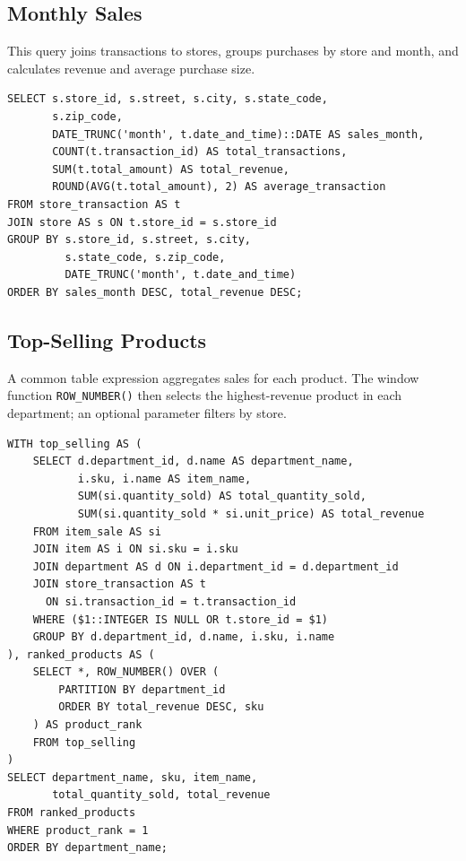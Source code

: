 \documentclass[11pt,letterpaper]{article}
\begin{document}
\subsection{Monthly Sales}

This query joins transactions to stores, groups purchases by store and month, and calculates revenue and average purchase size.

\begin{lstlisting}
SELECT s.store_id, s.street, s.city, s.state_code,
       s.zip_code,
       DATE_TRUNC('month', t.date_and_time)::DATE AS sales_month,
       COUNT(t.transaction_id) AS total_transactions,
       SUM(t.total_amount) AS total_revenue,
       ROUND(AVG(t.total_amount), 2) AS average_transaction
FROM store_transaction AS t
JOIN store AS s ON t.store_id = s.store_id
GROUP BY s.store_id, s.street, s.city,
         s.state_code, s.zip_code,
         DATE_TRUNC('month', t.date_and_time)
ORDER BY sales_month DESC, total_revenue DESC;
\end{lstlisting}

\subsection{Top-Selling Products}

A common table expression aggregates sales for each product. The window function \texttt{ROW\_NUMBER()} then selects the highest-revenue product in each department; an optional parameter filters by store.

\begin{lstlisting}
WITH top_selling AS (
    SELECT d.department_id, d.name AS department_name,
           i.sku, i.name AS item_name,
           SUM(si.quantity_sold) AS total_quantity_sold,
           SUM(si.quantity_sold * si.unit_price) AS total_revenue
    FROM item_sale AS si
    JOIN item AS i ON si.sku = i.sku
    JOIN department AS d ON i.department_id = d.department_id
    JOIN store_transaction AS t
      ON si.transaction_id = t.transaction_id
    WHERE ($1::INTEGER IS NULL OR t.store_id = $1)
    GROUP BY d.department_id, d.name, i.sku, i.name
), ranked_products AS (
    SELECT *, ROW_NUMBER() OVER (
        PARTITION BY department_id
        ORDER BY total_revenue DESC, sku
    ) AS product_rank
    FROM top_selling
)
SELECT department_name, sku, item_name,
       total_quantity_sold, total_revenue
FROM ranked_products
WHERE product_rank = 1
ORDER BY department_name;
\end{lstlisting}
\end{document}
